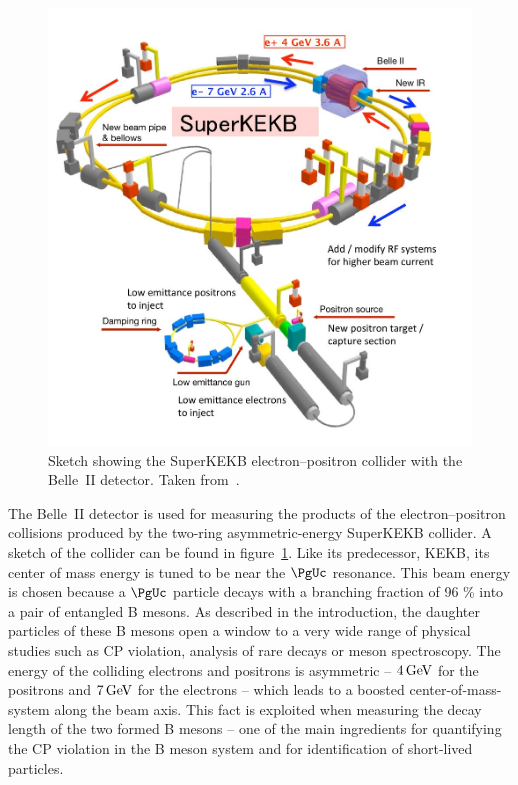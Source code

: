 \begin{figure}[t]
 \centering
 \includegraphics[height=0.35\textheight]{figures/experimental_setup/superkekb.jpg}
 \caption[Sketch showing the SuperKEKB electron--positron collider.]{Sketch showing the SuperKEKB electron--positron collider with the Belle~II detector. Taken from~\cite{DesyWebseite}.}
 \label{fig-superkekb}
\end{figure}


The Belle~II detector is used for measuring the products of the electron--positron collisions produced by the two-ring asymmetric-energy SuperKEKB collider. A sketch of the collider can be found in figure~\ref{fig-superkekb}. Like its predecessor, KEKB, its center of mass energy is tuned to be near the $\PgUc$ resonance. This beam energy is chosen because a $\PgUc$ particle decays with a branching fraction of 96 \% into a pair of entangled B mesons. As described in the introduction, the daughter particles of these B mesons open a window to a very wide range of physical studies such as CP violation, analysis of rare decays or meson spectroscopy. The energy of the colliding electrons and positrons is asymmetric -- $\unit[4]{GeV}$ for the positrons and $\unit[7]{GeV}$ for the electrons -- which leads to a boosted center-of-mass-system along the beam axis. This fact is exploited when measuring the decay length of the two formed B mesons -- one of the main ingredients for quantifying the CP violation in the B meson system and for identification of short-lived particles. 

